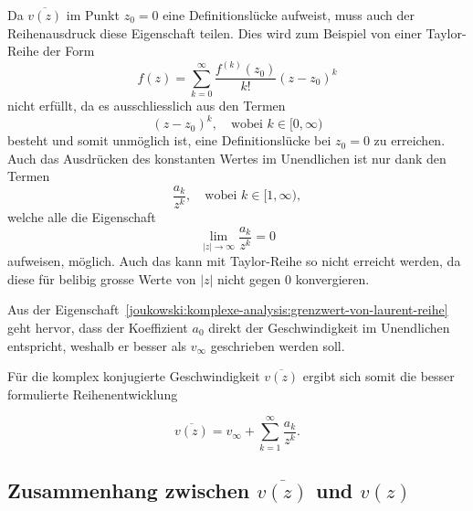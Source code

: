 Da $\overline{v(z)}$ im Punkt $z_0 = 0$ eine Definitionslücke aufweist,
muss auch der Reihenausdruck diese Eigenschaft teilen.
Dies wird zum Beispiel von einer Taylor-Reihe der Form
\[
	f(z)
	=
	\displaystyle\sum_{k = 0}^{\infty}
	\frac{f^{(k)}(z_0)}{k!}
	(z - z_0)^k
\]
nicht erfüllt, da es ausschliesslich aus den Termen
\[
	(z - z_0)^k,
	\quad
	\text{wobei }
	k \in [0, \infty)
\]
besteht und somit unmöglich ist, eine Definitionslücke bei $z_0 = 0$ zu erreichen.
Auch das Ausdrücken des konstanten Wertes im Unendlichen ist nur dank den Termen
\[
	\frac{a_k}{z^k},
	\quad
	\text{wobei }
	k \in [1, \infty),
\]
welche alle die Eigenschaft
\begin{equation}
	\displaystyle\lim_{|z|\to \infty}
	\frac{a_k}{z^k}
	=
	0
	\label{joukowski:komplexe-analysis:grenzwert-von-laurent-reihe}
\end{equation}
aufweisen, möglich.
Auch das kann mit Taylor-Reihe so nicht erreicht werden, da diese für belibig grosse Werte von $|z|$ nicht gegen $0$ konvergieren.
%

Aus der Eigenschaft~\eqref{joukowski:komplexe-analysis:grenzwert-von-laurent-reihe}
geht hervor, dass der Koeffizient $a_0$ direkt der Geschwindigkeit im Unendlichen entspricht, 
weshalb er besser als $v_\infty$ geschrieben werden soll.

Für die komplex konjugierte Geschwindigkeit $\overline{v(z)}$ ergibt sich somit die besser formulierte Reihenentwicklung

\begin{equation}
	\overline{v(z)}
	=
	v_\infty + \sum_{k=1}^{\infty} \frac{a_k}{z^k}.
	\label{joukowski:komplexe-analysis:laurent-reihe}
\end{equation}

\subsection{Zusammenhang zwischen $\overline{v(z)}$ und $v(z)$}

